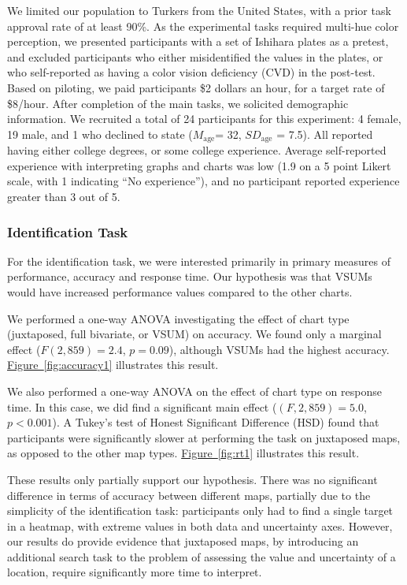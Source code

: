 \documentclass{vgtc}                          %
\newcommand{\figref}[1]{\hyperref[#1]{Figure~\ref*{#1}}}
\begin{document}
We limited our population to Turkers from the United States, with a prior task approval rate of at least 90\%. As the experimental tasks required multi-hue color perception, we presented participants with a set of Ishihara plates as a pretest, and excluded participants who either misidentified the values in the plates, or who self-reported as having a color vision deficiency (CVD) in the post-test. Based on piloting, we paid participants \$2 dollars an hour, for a target rate of \$8/hour. After completion of the main tasks, we solicited demographic information. We recruited a total of 24 participants for this experiment: 4 female, 19 male, and 1 who declined to state ($M_{\text{age}}$= 32, $SD_{\text{age}}$ = 7.5). All reported having either college degrees, or some college experience. Average self-reported experience with interpreting graphs and charts was low (1.9 on a 5 point Likert scale, with 1 indicating ``No experience''), and no participant reported experience greater than 3 out of 5.

\subsubsection{Identification Task}
\accuracyFig
\responseTimeFig

For the identification task, we were interested primarily in primary measures of performance, accuracy and response time. Our hypothesis was that VSUMs would have increased performance values compared to the other charts.

We performed a one-way ANOVA investigating the effect of chart type (juxtaposed, full bivariate, or VSUM) on accuracy. We found only a marginal effect ($F(2,859) = 2.4$, $p=0.09$), although VSUMs had the highest accuracy. \figref{fig:accuracy1} illustrates this result.

We also performed a one-way ANOVA on the effect of chart type on response time. In this case, we did find a significant main effect ($(F,2,859) = 5.0$, $p<0.001$). A Tukey's test of Honest Significant Difference (HSD) found that participants were significantly slower at performing the task on juxtaposed maps, as opposed to the other map types. \figref{fig:rt1} illustrates this result.

These results only partially support our hypothesis. There was no significant difference in terms of accuracy between different maps, partially due to the simplicity of the identification task: participants only had to find a single target in a heatmap, with extreme values in both data and uncertainty axes. However, our results do provide evidence that juxtaposed maps, by introducing an additional search task to the problem of assessing the value and uncertainty of a location, require significantly more time to interpret.
\end{document}
